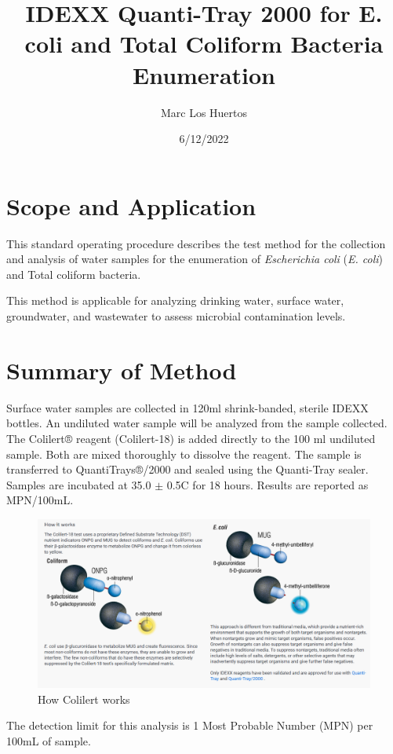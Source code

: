 \documentclass[12pt]{../SOP4_alpha}\usepackage[]{graphicx}\usepackage[]{xcolor}
\title{IDEXX Quanti-Tray 2000 for E. coli and Total Coliform Bacteria Enumeration}
\date{6/12/2022}
\author{Marc Los Huertos}
\begin{document}
\maketitle

\section{Scope and Application}

\NP This standard operating procedure describes the test method for the collection and analysis of water samples for the enumeration of \emph{Escherichia coli} (\emph{E. coli}) and Total coliform bacteria.

\NP This method is applicable for analyzing drinking water, surface water, groundwater, and wastewater to assess microbial contamination levels.

\section{Summary of Method}

\NP Surface water samples are collected in 120ml shrink-banded, sterile IDEXX 
bottles. An undiluted water sample will be analyzed from the sample collected.
The Colilert® reagent  (Colilert-18)  is added directly to the 100 ml undiluted sample. Both 
are mixed thoroughly to dissolve the reagent. The sample is transferred to 
QuantiTrays®/2000 and sealed using the Quanti-Tray sealer. Samples are incubated  at 35.0 $\pm$ 0.5\degree C for 18 hours. Results are reported as MPN/100mL. 

\begin{figure}
  \includegraphics[width=\linewidth]{figures/Colilert_How_it_works}
  \caption{How Colilert works}
  \label{fig:colilert}
\end{figure}

\NP The detection limit for this analysis is 1 Most Probable Number (MPN) per 100mL of sample. 
\end{document}
